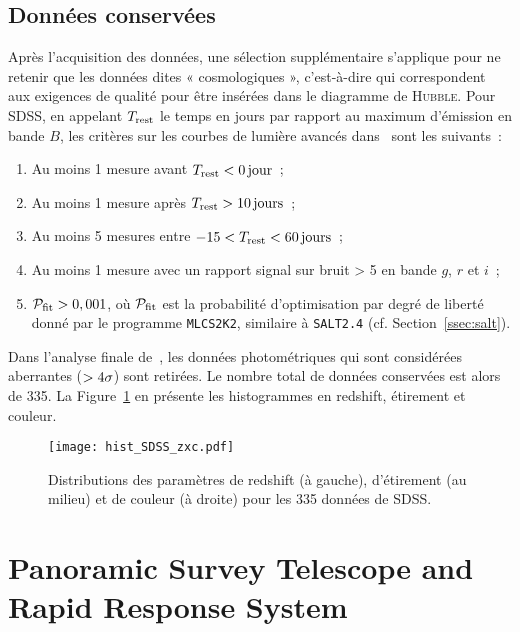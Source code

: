 \documentclass[../main/main.tex]{subfiles}
\begin{document}
\subsection{Données conservées}\label{ssec:sdssdata}

Après l'acquisition des données, une sélection supplémentaire s'applique pour ne
retenir que les données dites « cosmologiques », c'est-à-dire qui correspondent
aux exigences de qualité pour être insérées dans le diagramme de
\textsc{Hubble}. Pour SDSS, en appelant $T_{\rm rest}$ le temps en jours par
rapport au maximum d'émission en bande $B$, les critères sur les courbes de
lumière avancés dans~\cite{kessler2009b} sont les suivants~:

\begin{enumerate}
    \item Au moins 1 mesure avant $T_{\rm rest} < \SI{0}{jour}$~;
    \item Au moins 1 mesure après $T_{\rm rest} > \SI{10}{jours}$~;
    \item Au moins 5 mesures entre $-15 < T_{\rm rest} < \SI{60}{jours}$~;
    \item Au moins 1 mesure avec un rapport signal sur bruit > 5 en bande $g$,
        $r$ et $i$~;
    \item $\mathcal{P}_{\rm fit} > 0,001$, où $\mathcal{P}_{\rm fit}$ est la
        probabilité d'optimisation par degré de liberté donné par le programme
        \texttt{MLCS2K2}, similaire à \texttt{SALT2.4} (cf.
        Section~\ref{ssec:salt}).
\end{enumerate}
Dans l'analyse finale de~\cite{scolnic2018}, les données photométriques qui sont
considérées aberrantes ($>4\sigma$) sont retirées. Le nombre total de données
conservées est alors de 335. La Figure~\ref{fig:sdsshist} en présente les
histogrammes en redshift, étirement et couleur.

\begin{figure}[ht]
    \centering
    \texttt{[image: hist\_SDSS\_zxc.pdf]}
    \caption[Distributions des paramètres de redshift, étirement et couleur de
    SDSS]{Distributions des paramètres de redshift (à gauche), d'étirement (au
    milieu) et de couleur (à droite) pour les 335 données de SDSS.}
    \label{fig:sdsshist}
\end{figure}

\section{Panoramic Survey Telescope and Rapid Response
System}\label{sec:ps1}
\end{document}
